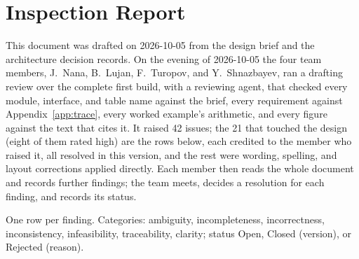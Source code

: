 \section{Inspection Report}\label{app:inspection}

This document was drafted on 2026-10-05 from the design brief and the architecture decision records. On the evening of 2026-10-05 the four team members, J.~Nana, B.~Lujan, F.~Turopov, and Y.~Shnazbayev, ran a drafting review over the complete first build, with a reviewing agent, that checked every module, interface, and table name against the brief, every requirement against Appendix~\ref{app:trace}, every worked example's arithmetic, and every figure against the text that cites it. It raised 42 issues; the 21 that touched the design (eight of them rated high) are the rows below, each credited to the member who raised it, all resolved in this version, and the rest were wording, spelling, and layout corrections applied directly. Each member then reads the whole document and records further findings; the team meets, decides a resolution for each finding, and records its status.

One row per finding. Categories: ambiguity, incompleteness, incorrectness, inconsistency, infeasibility, traceability, clarity; status Open, Closed (version), or Rejected (reason).

